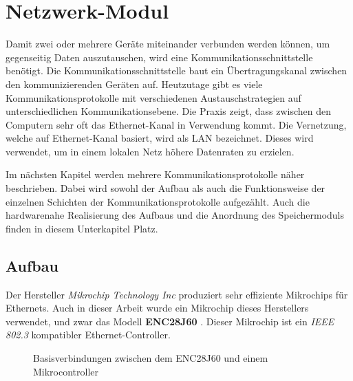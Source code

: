 \section{Netzwerk-Modul}\label{sec:network}

Damit zwei oder mehrere Geräte miteinander verbunden werden können, um gegenseitig Daten auszutauschen, wird eine Kommunikationsschnittstelle benötigt. Die Kommunikationsschnittstelle baut ein Übertragungskanal zwischen den kommunizierenden Geräten auf. Heutzutage gibt es viele Kommunikationsprotokolle mit verschiedenen Austauschstrategien auf unterschiedlichen Kommunikationsebene. Die Praxis zeigt, dass zwischen den Computern sehr oft das Ethernet-Kanal in Verwendung kommt. Die Vernetzung, welche auf Ethernet-Kanal basiert, wird als LAN bezeichnet. Dieses wird verwendet, um in einem lokalen Netz höhere Datenraten zu erzielen. \smallskip \smallskip

Im nächsten Kapitel werden mehrere Kommunikationsprotokolle näher beschrieben. Dabei wird sowohl der Aufbau als auch die Funktionsweise der einzelnen Schichten der Kommunikationsprotokolle aufgezählt. Auch die hardwarenahe Realisierung des Aufbaus und die Anordnung des Speichermoduls finden in diesem Unterkapitel Platz. 

\subsection{Aufbau}
Der Hersteller \textit{Mikrochip Technology Inc} \cite{Microchip} produziert sehr effiziente Mikrochips für Ethernets. Auch in dieser Arbeit wurde ein Mikrochip dieses Herstellers verwendet, und zwar das Modell \textbf{ENC28J60} \cite{Microchip:ENC28J60}. Dieser Mikrochip ist ein \textit{IEEE 802.3} \cite{IEEE:802.3} kompatibler Ethernet-Controller. \smallskip \smallskip

\begin{figure}[htbp]
	\centering
	\caption[Basisverbindungen zwischen dem ENC28J60 und einem Mikrocontroller]{Basisverbindungen zwischen dem ENC28J60 und einem Mikrocontroller \cite{Microchip:ENC28J60:Datasheet}}\label{fig:enc28j60}
\end{figure}

